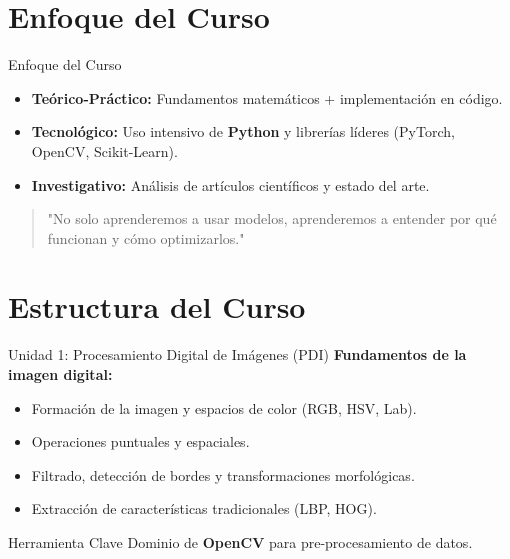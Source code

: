 \documentclass[10pt]{beamer}
\begin{document}
\section{Enfoque del Curso}

\begin{frame}{Enfoque del Curso}
    \begin{itemize}
        \item \textbf{Teórico-Práctico:} Fundamentos matemáticos + implementación en código.
        \item \textbf{Tecnológico:} Uso intensivo de \textbf{Python} y librerías líderes (PyTorch, OpenCV, Scikit-Learn).
        \item \textbf{Investigativo:} Análisis de artículos científicos y estado del arte.
    \end{itemize}
    \vspace{0.3cm}
    \begin{quote}
        "No solo aprenderemos a usar modelos, aprenderemos a entender por qué funcionan y cómo optimizarlos."
    \end{quote}
\end{frame}

\section{Estructura del Curso}

\begin{frame}{Unidad 1: Procesamiento Digital de Imágenes (PDI)}
    \textbf{Fundamentos de la imagen digital:}
    \begin{itemize}
        \item Formación de la imagen y espacios de color (RGB, HSV, Lab).
        \item Operaciones puntuales y espaciales.
        \item Filtrado, detección de bordes y transformaciones morfológicas.
        \item Extracción de características tradicionales (LBP, HOG).
    \end{itemize}
    \begin{block}{Herramienta Clave}
        Dominio de \textbf{OpenCV} para pre-procesamiento de datos.
    \end{block}
\end{frame}
\end{document}
